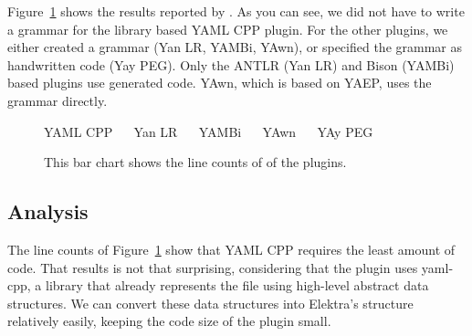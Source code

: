 Figure~\ref{fig:line_count} shows the results reported by \FileCountLines{}. As you can see, we did not have to write a grammar for the library based YAML CPP plugin. For the other plugins, we either created a grammar (Yan LR, YAMBi, YAwn), or specified the grammar as handwritten code (Yay PEG). Only the \gls{ANTLR} (Yan LR) and Bison (YAMBi) based plugins use generated code. YAwn, which is based on \gls{YAEP}, uses the grammar directly.

\begin{figure}[H]
  \begin{bchart}[max=2100, width=0.75\textwidth, unit={~Lines of Code}]




  \end{bchart}
  \begin{center}
  \vspace{-0.5cm}
     YAML CPP ~~
     Yan LR ~~
     YAMBi ~~
     YAwn ~~
     YAy PEG
  \vspace{-0.5cm}
  \end{center}
  \caption{This bar chart shows the line counts of of the  plugins.}
  \label{fig:line_count}
\end{figure}

\subsection{Analysis}

The line counts of Figure~\ref{fig:line_count} show that YAML CPP requires the least amount of code. That results is not that surprising, considering that the plugin uses yaml-cpp, a library that already represents the  file using high-level abstract data structures. We can convert these data structures into Elektra’s  structure relatively easily, keeping the code size of the plugin small.


